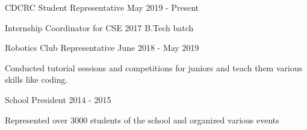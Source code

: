 

\begin{cventries}

 \projects
 {} %
 {CDCRC Student Representative} %
 {May 2019 - Present} %
 {} %
 {
   \begin{por} %
     \item []{Internship Coordinator for CSE 2017 B.Tech batch}
   \end{por}
 }

 \projects
    {} %
    {Robotics Club Representative} %
    {June 2018 - May 2019} %
    {} %
    {
      \begin{por} %
        \item []{Conducted tutorial sessions and competitions for juniors and teach them various skills like coding. }
      \end{por}
    }

\projects
    {} %
    {School President} %
    {2014 - 2015} %
    {} %
    {
      \begin{por} %
        \item []{Represented over 3000 students of the school and organized various events}
      \end{por}
    }

\end{cventries}
